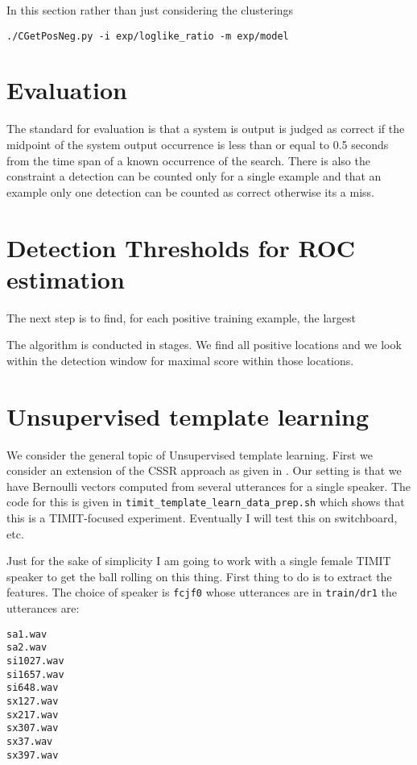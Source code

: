 \documentclass{article}
\begin{document}
In this section rather than just considering the clusterings
\begin{verbatim}
./CGetPosNeg.py -i exp/loglike_ratio -m exp/model
\end{verbatim}



\section{Evaluation}

The standard for evaluation is that a system is output is judged
as correct if the midpoint of the system output occurrence is 
less than or equal to 0.5 seconds from the time span of a known
occurrence of the search.  There is also the constraint a detection
can be counted only for a single example and that an example only one detection can be counted as correct otherwise its a miss.


\section{Detection Thresholds for ROC estimation}

The next step is to find, for each positive training example,
the largest 

The algorithm is conducted in stages. We find all positive
locations and we look within the 
detection window for maximal score within those locations.  

\section{Unsupervised template learning}

We consider the general topic of Unsupervised template learning. First we consider an extension of the CSSR approach as given in
\cite{shalizi04}.  Our setting is that we have Bernoulli vectors computed from several utterances for a single speaker. The code
for this is given in \texttt{timit\_template\_learn\_data\_prep.sh} which shows that this is a TIMIT-focused experiment. Eventually
I will test this on switchboard, etc.

Just for the sake of simplicity I am going to work with a single female TIMIT speaker to get the ball rolling on this thing. First thing
to do is to extract the features.  The choice of speaker is \texttt{fcjf0} whose utterances are in \texttt{train/dr1} the utterances are:
\begin{verbatim}
sa1.wav
sa2.wav
si1027.wav
si1657.wav
si648.wav
sx127.wav
sx217.wav
sx307.wav
sx37.wav
sx397.wav
\end{verbatim}
\end{document}
